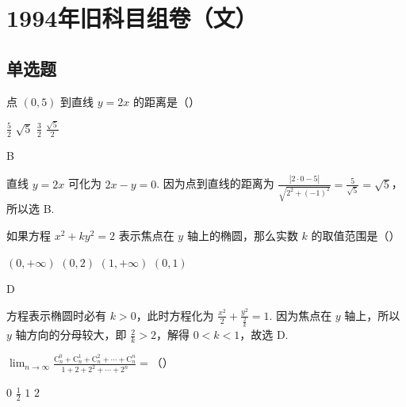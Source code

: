 \documentclass[UTF8,a4paper,oneside,11pt]{ctexbook}
\begin{document}
\mainmatter

\chapter{1994年旧科目组卷（文）}

\section{单选题}

\begin{problem}
点 \((0,5)\) 到直线 \(y=2x\) 的距离是（\quad）

\choices
    {\(\frac{5}{2}\)}
    {\(\sqrt{5}\)}
    {\(\frac{3}{2}\)}
    {\(\frac{\sqrt{5}}{2}\)}
\end{problem}

\begin{answer}
B
\end{answer}

\begin{solution}
直线 \(y=2x\) 可化为 \(2x-y=0\). 因为点到直线的距离为 \(\frac{|2\cdot 0-5|}{\sqrt{2^{2}+(-1)^{2}}}=\frac{5}{\sqrt{5}}=\sqrt{5}\)，所以选 B.
\end{solution}

\begin{problem}
如果方程 \(x^{2}+ky^{2}=2\) 表示焦点在 \(y\) 轴上的椭圆，那么实数 \(k\) 的取值范围是（\quad）

\choices
    {\((0,+\infty)\)}
    {\((0,2)\)}
    {\((1,+\infty)\)}
    {\((0,1)\)}
\end{problem}

\begin{answer}
D
\end{answer}

\begin{solution}
方程表示椭圆时必有 \(k>0\)，此时方程化为 \(\frac{x^{2}}{2}+\frac{y^{2}}{\frac{2}{k}}=1\). 因为焦点在 \(y\) 轴上，所以 \(y\) 轴方向的分母较大，即 \(\frac{2}{k}>2\)，解得 \(0<k<1\)，故选 D.
\end{solution}

\begin{problem}
\(\displaystyle\lim_{n\to\infty}\frac{\mathrm C_n^0+\mathrm C_n^1+\mathrm C_n^2+\cdots+\mathrm C_n^n}{1+2+2^{2}+\cdots+2^{n}}=\)（\quad）

\choices
    {\(0\)}
    {\(\frac{1}{2}\)}
    {\(1\)}
    {\(2\)}
\end{problem}
\end{document}
